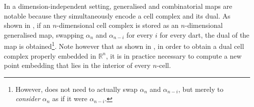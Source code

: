 In a dimension-independent setting, generalised and combinatorial maps are notable because they simultaneously encode a cell complex and its dual.
As shown in , if an $n$-dimensional cell complex is stored as an $n$-dimensional generalised map, swapping $\alpha_n$ and $\alpha_{n-i}$ for every $i$ for every dart, the dual of the map is obtained\footnote{However, does not need to actually swap $\alpha_n$ and $\alpha_{n-i}$, but merely to \emph{consider} $\alpha_n$ as if it were $\alpha_{n-i}$.}.
Note however that as shown in , in order to obtain a dual cell complex properly embedded in $\mathbb{R}^n$, it is in practice necessary to compute a new point embedding that lies in the interior of every $n$-cell.
\begin{figure}[tb]
\centering
{}
\quad
{}
\quad
{}
\quad
{}
\end{figure}
